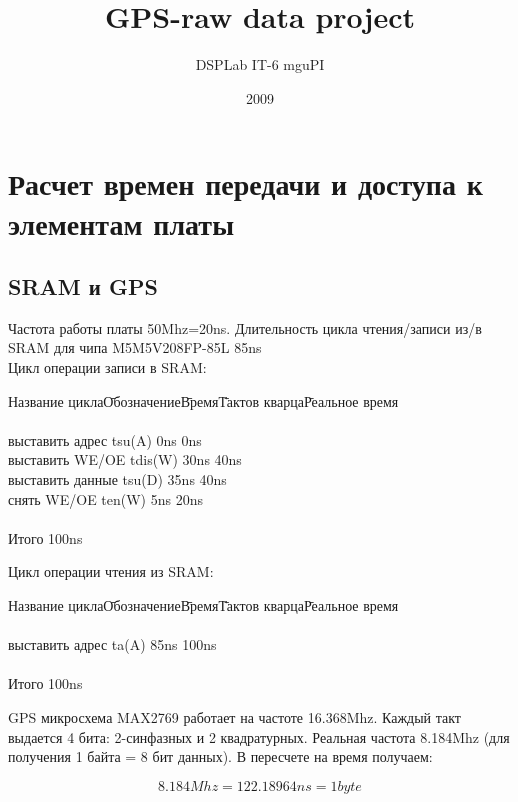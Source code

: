 \documentclass{report}
\title{GPS-raw data project}
\author{DSPLab IT-6 mguPI}
\date{2009}
\begin{document}
\maketitle

\chapter{Расчет времен передачи и доступа к элементам платы}
\section{SRAM и GPS}

Частота работы платы 50Mhz=20ns. Длительность цикла чтения/записи из/в SRAM для чипа M5M5V208FP-85L 85ns\\

Цикл операции записи в SRAM:
\begin{tabbing}
Название цикла\qquad\=Обозначение\qquad\=Время\qquad\=Тактов кварца\qquad\=Реальное время\\
\\
выставить адрес \> tsu(A) \> 0ns  \> 0ns \\
выставить WE/OE \> tdis(W) \> 30ns  \> 40ns \\
выставить данные \> tsu(D) \> 35ns  \> 40ns \\
снять WE/OE \> ten(W) \> 5ns  \> 20ns \\
\\
Итого \>  \> 100ns \\
\end{tabbing}

Цикл операции чтения из SRAM:
\begin{tabbing}
Название цикла\qquad\=Обозначение\qquad\=Время\qquad\=Тактов кварца\qquad\=Реальное время\\
\\
выставить адрес \> ta(A) \> 85ns  \> 100ns \\
\\
Итого \>  \> 100ns \\
\end{tabbing}

GPS микросхема MAX2769 работает на частоте 16.368Mhz. Каждый такт выдается 4 бита: 2-синфазных и 2 квадратурных. Реальная частота
8.184Mhz (для получения 1 байта = 8 бит данных). В пересчете на время получаем:

\begin{equation}
8.184Mhz = 122.18964ns = 1byte 
\end{equation}
\end{document}
